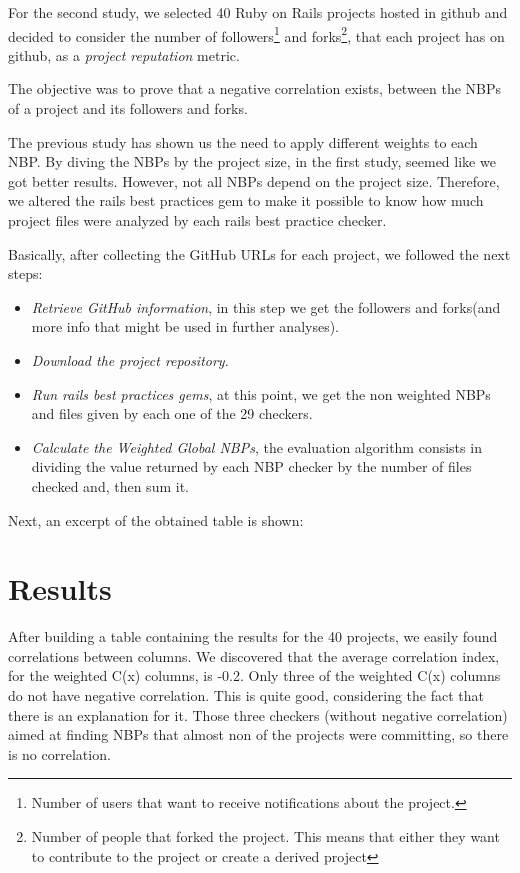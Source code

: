 For the second study, we selected 40 Ruby on Rails projects hosted in github and
decided to consider the number of 
\textsf{followers}\footnote{Number of users that want to receive notifications about the project.} and
\textsf{forks}\footnote{Number of people that forked the project. This means that either they want to contribute to the project or create a derived project}, 
that each project has on github, 
as a \emph{project reputation} metric. 

The objective was to prove that a negative correlation exists, between the NBPs of a project and its followers and forks. 

The previous study has shown us the need to apply different weights to each NBP. 
By diving the NBPs by the project size, in the first study, seemed like we got better results.
However, not all NBPs depend on the project size. 
Therefore, we altered the rails best practices gem to make it possible to know how much project files were analyzed 
by each rails best practice checker.

Basically, after collecting the GitHub URLs for each project, we followed the next steps:
\begin{itemize}
\item \emph{Retrieve GitHub information}, in this step we get the followers and forks(and more info that might be used in further analyses).
\item \emph{Download the project repository}.
\item \emph{Run rails best practices gems}, at this point, we get the non weighted NBPs and files given by each one of the 29 checkers.
\item \emph{Calculate the Weighted Global NBPs}, the evaluation algorithm consists in dividing the value returned by each NBP checker  by the number of files checked and, then sum it.
\end{itemize}

Next, an excerpt of the obtained table is shown:


\section{Results}\label{subsec:results}
After building a table containing the results for the 40 projects, we easily found correlations between columns.
We discovered that the average correlation index, for the weighted C(x) columns, is -0.2. Only three of the weighted C(x) columns do not have negative correlation. This is quite good, considering the fact that there is an explanation for it. 
Those three checkers (without negative correlation) aimed at finding  NBPs that almost non of the projects were committing, 
so there is no correlation.


